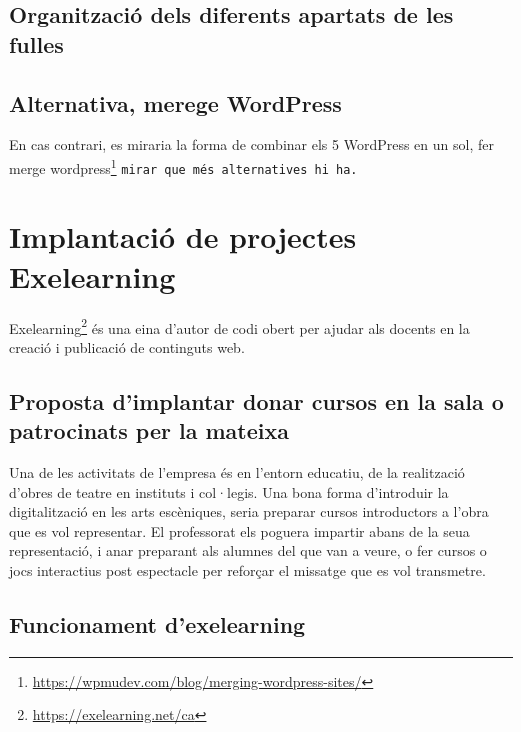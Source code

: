 \documentclass[
  10pt,
]{krantz}
\DeclareRobustCommand{\href}[2]{#2\footnote{\url{#1}}}
\begin{document}
\hypertarget{organitzaciuxf3-dels-diferents-apartats-de-les-fulles}{%
\section{Organització dels diferents apartats de les fulles}\label{organitzaciuxf3-dels-diferents-apartats-de-les-fulles}}

\hypertarget{alternativa-merege-wordpress}{%
\section{Alternativa, merege WordPress}\label{alternativa-merege-wordpress}}

En cas contrari, es miraria la forma de combinar els 5 WordPress en un sol, fer \href{https://wpmudev.com/blog/merging-wordpress-sites/}{merge wordpress} \texttt{mirar\ que\ més\ alternatives\ hi\ ha.}

\hypertarget{implantaciuxf3-de-projectes-exelearning}{%
\chapter{Implantació de projectes Exelearning}\label{implantaciuxf3-de-projectes-exelearning}}

\href{https://exelearning.net/ca}{Exelearning} és una eina d'autor de codi obert per ajudar als docents en la creació i publicació de continguts web.

\hypertarget{proposta-dimplantar-donar-cursos-en-la-sala-o-patrocinats-per-la-mateixa}{%
\section{Proposta d'implantar donar cursos en la sala o patrocinats per la mateixa}\label{proposta-dimplantar-donar-cursos-en-la-sala-o-patrocinats-per-la-mateixa}}

Una de les activitats de l'empresa és en l'entorn educatiu, de la realització d'obres de teatre en instituts i col·legis. Una bona forma d'introduir la digitalització en les arts escèniques, seria preparar cursos introductors a l'obra que es vol representar. El professorat els poguera impartir abans de la seua representació, i anar preparant als alumnes del que van a veure, o fer cursos o jocs interactius post espectacle per reforçar el missatge que es vol transmetre.

\hypertarget{funcionament-dexelearning}{%
\section{Funcionament d'exelearning}\label{funcionament-dexelearning}}
\end{document}
